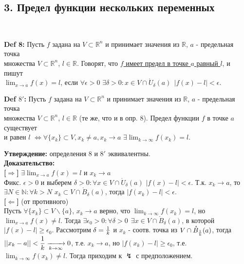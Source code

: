 \documentclass[book, 11pt]{report}
\begin{document}
        \subsection*{3. Предел функции нескольких переменных}
        \par{\ }
        \par{\textbf{Def 8: }Пусть $f$ задана на $V\subset\mathbb{R}^n$ и принимает значения из $\mathbb{R}$, $a$ - предельная точка \\ множества $V\subset\mathbb{R}^n$, $l\in\mathbb{R}$. Говорят, что \underline{$f$ имеет предел в точке $a$ равный $l$}, и пишут \\ $\displaystyle\lim_{x\to a}f(x)=l$, если $\forall\epsilon>0$ $\exists\delta>0: x\in V\cap\mathring{U}_{\delta}(a) \ \ |f(x)-l|<\epsilon$.}
        \vspace{0.3cm}
        \par{\textbf{Def $8'$: }Пусть $f$ задана на $V\subset\mathbb{R}^n$ и принимает значения из $\mathbb{R}$, $a$ - предельная точка \\ множества $V\subset\mathbb{R}^n$, $l\in\mathbb{R}$ (те же, что и в опр. 8). Предел функции $f$ в точке $a$ существует\\ и равен $l$ $\Leftrightarrow\forall\{x_k\}\subset V, x_k\ne a, x_k\to a$ $\displaystyle\exists\lim_{k\to\infty}f(x_k)=l$.}
        \vspace{0.3cm}
        \par{\textbf{Утверждение: }определения 8 и $8'$ эквивалентны.\\
        \textbf{Доказательство: } \\
        \textbf{[$\Rightarrow$]} $\displaystyle\exists\lim_{x\to a}f(x)=l$ и $x_k\to a$\\
        Фикс. $\epsilon>0$ и выберем $\delta>0:\forall x\in V\cap\mathring{U}_{\delta}(a)$ $|f(x)-l|<\epsilon$. Т.к. $x_k\to a$, то $\exists N\in\mathbb{N}:\forall k>N$ $x_k\subset V\cap\mathring{B}_{\delta}(a)$, тогда $|f(x_k)-l|<\epsilon$.\\
        \textbf{[$\Leftarrow$]} (от противного)\\
        Пусть $\forall\{x_k\}\subset V\backslash\{a\}$, $x_k\to a$ верно, что $\displaystyle\lim_{k\to\infty}f(x_k)=l$, но $\displaystyle\lim_{x\to a}f(x)\ne l$. Тогда $\displaystyle\exists\epsilon_0>0:\forall\delta>0 \ \ \exists x\in V\cap\mathring{B}_{\delta}(a)$, в которой $|f(x)-l|\geq\epsilon_0$. Рассмотрим $\delta={1\over k}$ и $x_k$ - соотв. точка из $V\cap\mathring{B}_{1\over k}(a)$, тогда $\displaystyle||x_k-a||<{1\over k}\xrightarrow[k\to\infty]{}0$, т.е. $x_k\to a$, но $|f(x_k)-l|\geq\epsilon_0$, т.е. $\displaystyle\lim_{k\to\infty}f(x_k)\ne l$. Тогда приходим к $\lightning$ с предположением.
        }
\end{document}
